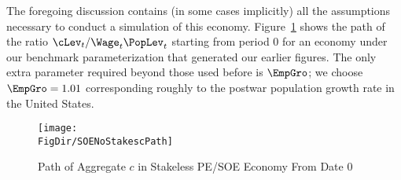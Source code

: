 \documentclass{\handout}
\begin{document}
The foregoing discussion contains (in some cases implicitly) all the
assumptions necessary to conduct a simulation of this economy.
Figure~\ref{fig:SOENoStakescPath} shows the path of the ratio $\cLev_{t}/\Wage_{t}\PopLev_{t}$ starting from
period 0 for an economy under our benchmark parameterization that generated
our earlier figures.  The
only extra parameter required beyond those used before is $\EmpGro$; we choose $\EmpGro=1.01$ corresponding
roughly to the postwar population growth rate in the United States.

\begin{figure}
\caption{Path of Aggregate $c$ in Stakeless PE/SOE Economy From Date 0}
\texttt{[image: \\FigDir/SOENoStakescPath]}
\label{fig:SOENoStakescPath}
\end{figure}
\end{document}

